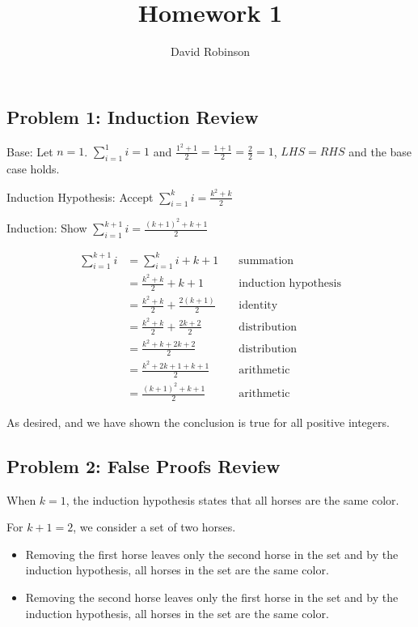 \documentclass{article}
\title{Homework 1}
\author{David Robinson}
\date{}
\begin{document}
\maketitle

\subsection*{Problem 1: Induction Review}

Base:
Let $n=1$. $\sum_{i=1}^1 i = 1$ and $\frac{1^2 + 1}{2} = \frac{1 + 1}{2} = \frac{2}{2} = 1$,
$LHS=RHS$ and the base case holds.
\vspace{1em}

Induction Hypothesis:
Accept $\sum_{i=1}^k i = \frac{k^2 + k}{2}$
\vspace{1em}

Induction:
Show $\sum_{i=1}^{k+1} i = \frac{{(k+1)}^2 + k + 1}{2}$

\[\begin{aligned}
    \sum_{i=1}^{k+1} i &= \sum_{i=1}^k i + k + 1 \quad & \text{summation} \\
    &= \frac{k^2 + k}{2} + k + 1 \quad & \text{induction hypothesis} \\
    &= \frac{k^2 + k}{2} + \frac{2 (k+1)}{2} \quad & \text{identity} \\
    &= \frac{k^2 + k}{2} + \frac{2k + 2}{2} \quad & \text{distribution} \\
    &= \frac{k^2 + k + 2k + 2}{2} \quad & \text{distribution} \\
    &= \frac{k^2 + 2k + 1 + k + 1}{2} \quad & \text{arithmetic} \\
    &= \frac{{(k+1)}^2 + k+1}{2} \quad & \text{arithmetic}
\end{aligned}\]

As desired, and we have shown the conclusion is true for all positive integers.

\subsection*{Problem 2: False Proofs Review}

When $k=1$, the induction hypothesis states that all horses are the same color.
\vspace{1em}

For $k+1=2$, we consider a set of two horses.
\begin{itemize}
    \item Removing the first horse leaves only the second horse in the set and by the induction hypothesis, all horses in the set are the same color.
    \item Removing the second horse leaves only the first horse in the set and by the induction hypothesis, all horses in the set are the same color.
\end{itemize}
\end{document}
